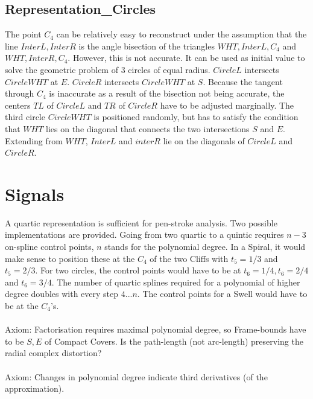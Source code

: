 \documentclass[a4paper,portrait]{report}
\begin{document}
\section{Representation\_Circles}
The point $C_{4}$ can be relatively easy to reconstruct under the assumption that the line $InterL,InterR$ is the angle bisection of the triangles $WHT,InterL,C_{4}$ and $WHT,InterR,C_{4}$. However, this is not accurate. It can be used as initial value to solve the geometric problem of 3 circles of equal radius. $CircleL$ intersects $CircleWHT$ at $E$. $CircleR$ intersects $CircleWHT$ at $S$. Because the tangent through $C_{4}$ is inaccurate as a result of the bisection not being accurate, the centers $TL$ of $CircleL$ and $TR$ of $CircleR$ have to be adjusted marginally. The third circle $CircleWHT$ is positioned randomly, but has to satisfy the condition that $WHT$ lies on the diagonal that connects the two intersections $S$ and $E$. Extending from $WHT$, $InterL$ and $interR$ lie on the diagonals of $CircleL$ and $CircleR$.

\chapter{Signals}
A quartic representation is sufficient for pen-stroke analysis. Two possible implementations are provided. Going from two quartic to a quintic requires $n-3$ on-spline control points, $n$ stands for the polynomial degree. In a Spiral, it would make sense to position these at the $C_{4}$ of the two Cliffs with $t_{5}=1/3$ and $t_{5}=2/3$. For two circles, the control points would have to be at $t_{6}=1/4,t_{6}=2/4$ and $t_{6}=3/4$. The number of quartic splines required for a polynomial of higher degree doubles with every step $4...n$. The control points for a Swell would have to be at the $C_{4}$'s.\\\\
Axiom: Factorisation requires maximal polynomial degree, so Frame-bounds have to be $S,E$ of Compact Covers. Is the path-length (not arc-length) preserving the radial complex distortion?\\\\
Axiom: Changes in polynomial degree indicate third derivatives (of the approximation).\\\\
\iffalse
\printbibliography
\fi
{}

\end{document}

